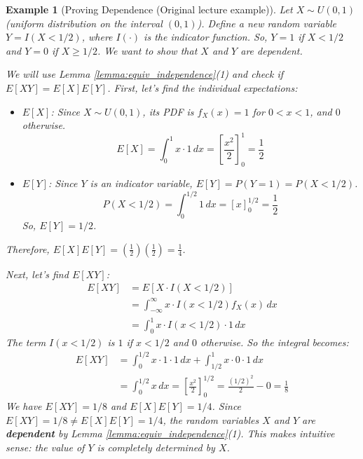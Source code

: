 \documentclass[11pt]{article}
\newtheorem{example}[theorem]{Example}
\begin{document}
\begin{example}[Proving Dependence (Original lecture example)]
\label{ex:dependent_indicator}
Let $X \sim U(0,1)$ (uniform distribution on the interval $(0,1)$). Define a new random variable $Y = I(X < 1/2)$, where $I(\cdot)$ is the indicator function. So, $Y=1$ if $X < 1/2$ and $Y=0$ if $X \ge 1/2$. We want to show that $X$ and $Y$ are dependent.

We will use Lemma \ref{lemma:equiv_independence}(1) and check if $E[XY] = E[X]E[Y]$.
First, let's find the individual expectations:
\begin{itemize}
    \item $E[X]$: Since $X \sim U(0,1)$, its PDF is $f_X(x) = 1$ for $0 < x < 1$, and $0$ otherwise.
    \begin{equation}
    E[X] = \int_0^1 x \cdot 1 \, dx = \left[\frac{x^2}{2}\right]_0^1 = \frac{1}{2}
    \end{equation}
    \item $E[Y]$: Since $Y$ is an indicator variable, $E[Y] = P(Y=1) = P(X < 1/2)$.
    \begin{equation}
    P(X < 1/2) = \int_0^{1/2} 1 \, dx = [x]_0^{1/2} = \frac{1}{2}
    \end{equation}
    So, $E[Y] = 1/2$.
\end{itemize}
Therefore, $E[X]E[Y] = (\frac{1}{2})(\frac{1}{2}) = \frac{1}{4}$.

Next, let's find $E[XY]$:
\begin{align*}
E[XY] &= E[X \cdot I(X < 1/2)] \\
&= \int_{-\infty}^{\infty} x \cdot I(x < 1/2) f_X(x) \, dx \\
&= \int_0^1 x \cdot I(x < 1/2) \cdot 1 \, dx
\end{align*}
The term $I(x < 1/2)$ is $1$ if $x < 1/2$ and $0$ otherwise. So the integral becomes:
\begin{align*}
E[XY] &= \int_0^{1/2} x \cdot 1 \cdot 1 \, dx + \int_{1/2}^1 x \cdot 0 \cdot 1 \, dx \\
&= \int_0^{1/2} x \, dx = \left[\frac{x^2}{2}\right]_0^{1/2} = \frac{(1/2)^2}{2} - 0 = \frac{1}{8}
\end{align*}
We have $E[XY] = 1/8$ and $E[X]E[Y] = 1/4$.
Since $E[XY] = 1/8 \neq E[X]E[Y] = 1/4$, the random variables $X$ and $Y$ are \textbf{dependent} by Lemma \ref{lemma:equiv_independence}(1). This makes intuitive sense: the value of $Y$ is completely determined by $X$.
\end{example}

\end{document}
